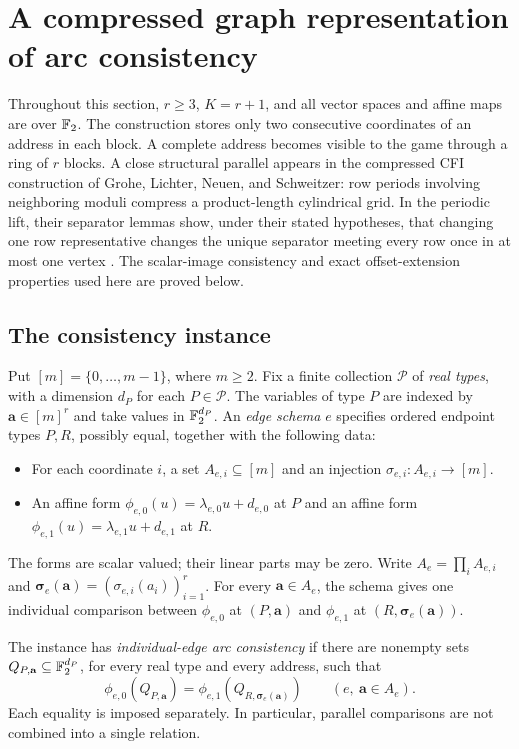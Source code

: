\section{A compressed graph representation of arc consistency}
\label{comp:section}

Throughout this section, $r\geq 3$, $K=r+1$, and all vector spaces and
affine maps are over $\mathbb{F}_2$.  The construction stores only two consecutive
coordinates of an address in each block.  A complete address becomes
visible to the game through a ring of $r$ blocks.  A close structural
parallel appears in the compressed CFI construction of Grohe, Lichter,
Neuen, and Schweitzer: row periods involving neighboring moduli compress
a product-length cylindrical grid.  In the periodic lift, their separator
lemmas show, under their stated hypotheses, that changing one row
representative changes the unique separator meeting every row once in at
most one vertex
\cite[Section~5, Lemmas~19, 29, and~30]{CFICompression}.  The scalar-image
consistency and exact offset-extension properties used here are proved below.

\subsection{The consistency instance}

Put $[m]=\{0,\ldots,m-1\}$, where $m\geq 2$.  Fix a finite collection
$\mathcal P$ of \emph{real types}, with a dimension $d_P$ for each
$P\in\mathcal P$.  The variables
of type $P$ are indexed by $\mathbf a\in[m]^r$ and take values in
$\mathbb{F}_2^{d_P}$.  An \emph{edge schema} $e$ specifies ordered endpoint types
$P,R$, possibly equal, together with the following data:
\begin{itemize}
\item For each coordinate $i$, a set $A_{e,i}\subseteq[m]$ and an injection
  $\sigma_{e,i}\colon A_{e,i}\longrightarrow[m]$.
\item An affine form $\phi_{e,0}(u)=\lambda_{e,0}u+d_{e,0}$ at $P$ and
  an affine form $\phi_{e,1}(u)=\lambda_{e,1}u+d_{e,1}$ at $R$.
\end{itemize}
The forms are scalar valued; their linear parts may be zero.  Write
$A_e=\prod_i A_{e,i}$ and
$\boldsymbol\sigma_e(\mathbf a)=(\sigma_{e,i}(a_i))_{i=1}^r$.
For every $\mathbf a\in A_e$, the schema gives one individual comparison
between $\phi_{e,0}$ at $(P,\mathbf a)$ and $\phi_{e,1}$ at
$(R,\boldsymbol\sigma_e(\mathbf a))$.

\begin{definition}\label{comp:ac}
The instance has \emph{individual-edge arc consistency} if there are
nonempty sets $Q_{P,\mathbf a}\subseteq\mathbb{F}_2^{d_P}$, for every real type
and every address, such that
\begin{equation}\label{comp:ac-equation}
 \phi_{e,0}(Q_{P,\mathbf a})
 =\phi_{e,1}(Q_{R,\boldsymbol\sigma_e(\mathbf a)})
 \qquad(e,\ \mathbf a\in A_e).
\end{equation}
Each equality is imposed separately.  In particular, parallel comparisons
are not combined into a single relation.
\end{definition}

